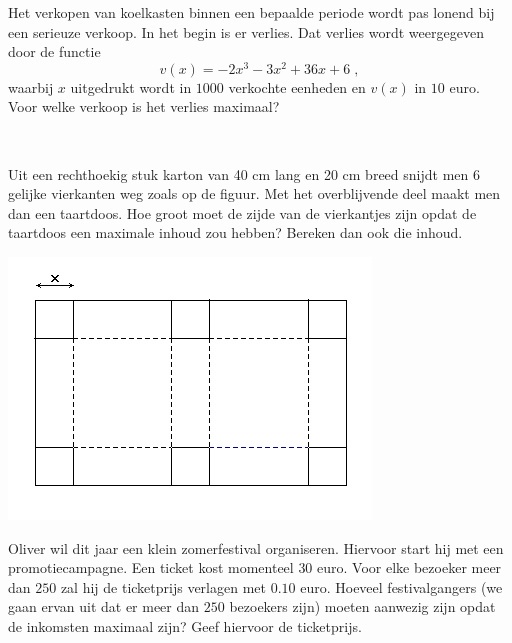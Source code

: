 \documentclass[a4paper,12pt,twoside]{article}
\begin{document}
\begin{oefening}
  Het verkopen van koelkasten binnen een bepaalde periode wordt pas lonend bij een serieuze verkoop. In het begin is er verlies. Dat verlies wordt weergegeven door de functie
  $$v(x)=-2x^3-3x^2+36x+6\;,$$
  waarbij $x$ uitgedrukt wordt in $1000$ verkochte eenheden en $v(x)$ in $10$ euro. Voor welke verkoop is het verlies maximaal?
\end{oefening}

\begin{oefening}\\
  \begin{minipage}{0.6\textwidth}
    Uit een rechthoekig stuk karton van 40 cm lang en 20 cm breed snijdt men 6 gelijke
    vierkanten weg zoals op de figuur. Met het overblijvende deel maakt men dan een
    taartdoos. Hoe groot moet de zijde van de vierkantjes zijn opdat de taartdoos een
    maximale inhoud zou hebben? Bereken dan ook die inhoud.
  \end{minipage}
  \begin{minipage}{0.4\textwidth}
    \centering
    \includegraphics[width=\textwidth]{rechthoekig-stuk-karton}
  \end{minipage}
\end{oefening}

\begin{oefening}
  Oliver wil dit jaar een klein zomerfestival organiseren. Hiervoor start hij met een promotiecampagne. Een ticket kost momenteel $30$ euro. Voor elke bezoeker meer dan $250$ zal hij de ticketprijs verlagen met $0.10$ euro. Hoeveel festivalgangers (we gaan ervan uit dat er meer dan $250$ bezoekers zijn) moeten aanwezig zijn opdat de inkomsten maximaal zijn? Geef hiervoor de ticketprijs.
\end{oefening}
\end{document}
